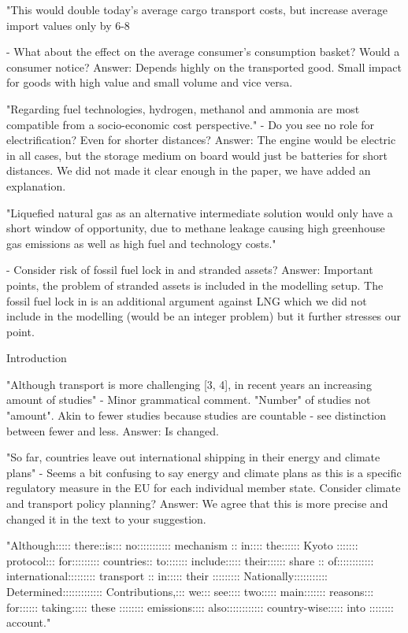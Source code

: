 "This would double today's average cargo transport costs, but increase average import values only by 6-8 %

-	What about the effect on the average consumer's consumption basket? Would a consumer notice?
Answer: Depends highly on the transported good. Small impact for goods with high value and small volume and vice versa.

"Regarding fuel technologies, hydrogen, methanol and ammonia are most compatible from a socio-economic cost perspective."
-	Do you see no role for electrification? Even for shorter distances?
Answer: The engine would be electric in all cases, but the storage medium on board would just be batteries for short distances. We did not made it clear enough in the paper, we have added an explanation.

"Liquefied natural gas as an alternative intermediate solution would only have a short window of opportunity, due to methane leakage causing high greenhouse gas emissions as well as high fuel and technology costs."

-	Consider risk of fossil fuel lock in and stranded assets?
Answer: Important points, the problem of stranded assets is included in the modelling setup. The fossil fuel lock in is an additional argument against LNG which we did not include in the modelling (would be an integer problem) but it further stresses our point.

Introduction

 "Although transport is more challenging [3, 4], in recent years an increasing amount of studies"
-	Minor grammatical comment. "Number" of studies not "amount". Akin to fewer studies because studies are countable - see distinction between fewer and less.
Answer: Is changed.

"So far, countries leave out international shipping in their energy and climate plans"
-	Seems a bit confusing to say energy and climate plans as this is a specific regulatory measure in the EU for each individual member state. Consider climate and transport policy planning?
Answer: We agree that this is more precise and changed it in the text to your suggestion.

"Although::::: there::is::: no::::::::::: mechanism :: in:::: the:::::: Kyoto ::::::: protocol::: for::::::::: countries:: to::::::: include::::: their:::::: share :: of:::::::::::: international::::::::: transport :: in::::: their ::::::::: Nationally::::::::::: Determined::::::::::::: Contributions,::: we::: see:::: two::::: main::::::: reasons::: for:::::: taking::::: these :::::::: emissions:::: also:::::::::::: country-wise::::: into :::::::: account."

